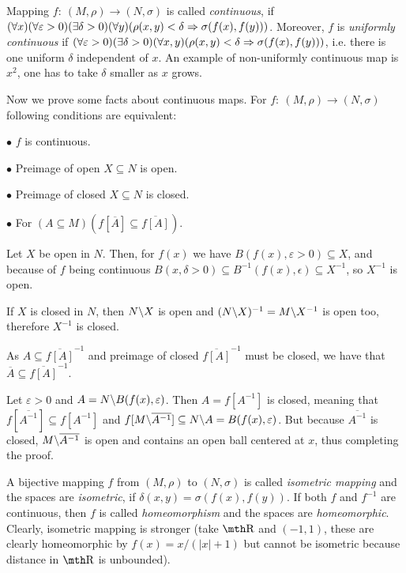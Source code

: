 \medskip

Mapping $f:\ (M,\rho)\to(N,\sigma)$ is called {\it continuous}, if $(\forall x)
(\forall \varepsilon > 0)(\exists \delta > 0)(\forall y)(\rho(x,y) < \delta 
\Rightarrow \sigma(f(x),f(y)))$. Moreover, $f$ is {\it uniformly continuous} if 
$(\forall \varepsilon>0)(\exists \delta > 0)(\forall x,y)(\rho(x,y) < \delta 
\Rightarrow \sigma(f(x),f(y)))$, i.e. there is one uniform $\delta$ independent of 
$x$.
\smallskip
An example of non-uniformly continuous map is $x^2$, one has to take $\delta$ 
smaller as $x$ grows.

\medskip
Now we prove some facts about continuous maps. For $f:\ (M,\rho)\to(N,\sigma)$ 
following conditions are equivalent:

{\parindent0.5in\parskip6pt
	\item{$\bullet$} $f$ is continuous.
	\item{$\bullet$} Preimage of open $X\subseteq N$ is open.
	\item{$\bullet$} Preimage of closed $X\subseteq N$ is closed.
	\item{$\bullet$} For $(A\subseteq M)(f[\overline A] \subseteq \overline
		{f[A]})$.

}

Let $X$ be open in $N$. Then, for $f(x)$ we have $B(f(x),\varepsilon>0)
\subseteq X$, and because of $f$ being continuous $B(x,\delta>0)\subseteq 
B^{-1}(f(x), \epsilon) \subseteq X^{-1}$, so $X^{-1}$ is open. 

If $X$ is closed in $N$, then $N\backslash X$ is open and $(N\backslash X)^{-1} = 
M\backslash X^{-1}$ is open too, therefore $X^{-1}$ is closed.

As $A\subseteq \overline{f[A]}^{-1}$ and preimage of closed $\overline{f[A]}^
{-1}$ must be closed, we have that $\overline A\subseteq \overline{f[A]}^{-1}$.

Let $\varepsilon > 0$ and $A=N\backslash B(f(x),\varepsilon)$. Then $A=f[A^{-1}]$ is 
closed, meaning that $f[\overline{A^{-1}}] \subseteq f[A^{-1}]$ and $f[M\backslash 
\overline{ A^{-1}}] \subseteq N\backslash A = B(f(x),\varepsilon)$. But because 
$\overline{ A^{-1}}$ is closed, $M\backslash \overline{ A^{-1}}$ is open and contains 
an open ball centered at $x$, thus completing the proof.

\medskip

 A bijective mapping $f$ from $(M,\rho)$ to $(N,\sigma)$ is 
called {\it isometric mapping} and the spaces are {\it isometric}, if 
$\delta(x,y) = \sigma(f(x),f(y))$. If both $f$ and $f^{-1}$ are continuous, 
then $f$ is called {\it homeomorphism} and the spaces are {\it homeomorphic}. 
Clearly, isometric mapping is stronger (take $\R$ and $(-1,1)$, these are 
clearly homeomorphic by $f(x) = x/(|x|+1)$ but cannot be isometric because 
distance in $\R$ is unbounded).
\smallskip

